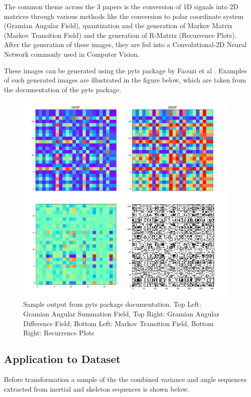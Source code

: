 \documentclass[conference]{IEEEtran}
\begin{document}
The common theme across the 3 papers is the conversion of 1D signals into 2D matrices through various methods like the conversion to polar coordinate system (Gramian Angular Field), quantization and the generation of Markov Matrix (Markov Transition Field) and the generation of R-Matrix (Recurrence Plots). After the generation of these images, they are fed into a Convolutional-2D Neural Network commonly used in Computer Vision.

These images can be generated using the pyts package by Faouzi et al \cite{johann_faouzi_2019_2561773}. Examples of such generated images are illustrated in the figure below, which are taken from the documentation of the pyts \cite{johann_faouzi_2019_2561773} package.

\begin{figure}[H]
\begin{center}
\includegraphics[scale=0.5]{Image/ts_to_img_sample.png}
\caption{\label{ts_to_img_sample} Sample output from pyts package documentation. Top Left: Gramian Angular Summation Field, Top Right: Gramian Angular Difference Field; Bottom Left: Markov Transition Field, Bottom Right: Recurrence Plots}
\end{center}
\end{figure}

\subsection{Application to Dataset}
Before transformation a sample of the the combined variance and angle sequences extracted from inertial and skeleton sequences is shown below.
\end{document}
